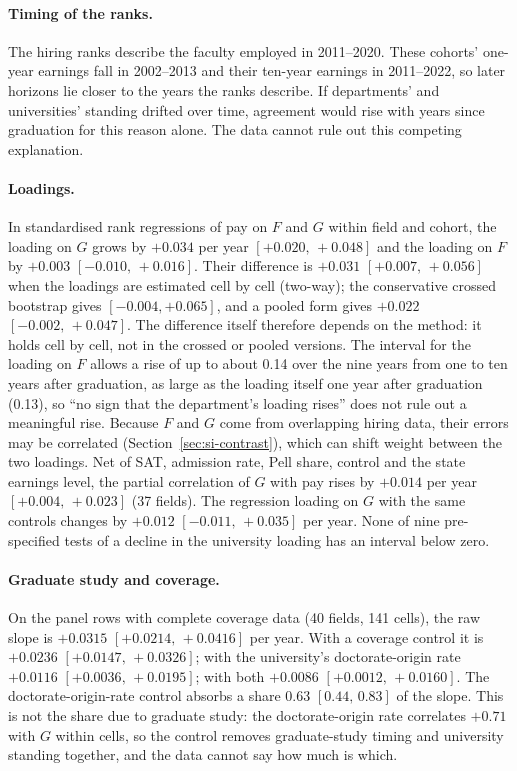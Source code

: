 \documentclass[11pt]{article}
\newcommand{\ci}[2]{$[#1,\allowbreak\,#2]$}
\begin{document}
\paragraph{Timing of the ranks.} The hiring ranks describe the faculty employed in 2011--2020. These cohorts'
one-year earnings fall in 2002--2013 and their ten-year earnings in 2011--2022, so later horizons lie closer to the
years the ranks describe. If departments' and universities' standing drifted over time, agreement would rise with
years since graduation for this reason alone. The data cannot rule out this competing explanation.

\paragraph{Loadings.} In standardised rank regressions of pay on $F$ and $G$ within field and cohort, the loading on
$G$ grows by $+0.034$ per year \ci{+0.020}{+0.048} and the loading on $F$ by $+0.003$ \ci{-0.010}{+0.016}. Their
difference is $+0.031$ \ci{+0.007}{+0.056} when the loadings are estimated cell by cell (two-way); the conservative
crossed bootstrap gives $[-0.004, +0.065]$, and a pooled form gives $+0.022$ \ci{-0.002}{+0.047}. The
difference itself therefore depends on the method: it holds cell by cell, not in the crossed or pooled versions. The
interval for the loading on $F$ allows a rise of up to about 0.14 over the nine years from one to ten years after
graduation, as large as the loading itself one year after graduation (0.13), so ``no sign that the department's
loading rises'' does not rule out a meaningful rise. Because $F$ and $G$ come from overlapping hiring data, their
errors may be correlated (Section~\ref{sec:si-contrast}), which can shift weight between the two loadings. Net of SAT,
admission rate, Pell share, control and the state earnings level, the partial correlation of $G$ with pay rises by
$+0.014$ per year \ci{+0.004}{+0.023} (37 fields). The regression loading on $G$ with the same
controls changes by $+0.012$ \ci{-0.011}{+0.035} per year. None of nine pre-specified tests of a decline in the
university loading has an interval below zero.

\paragraph{Graduate study and coverage.} On the panel rows with complete coverage data (40 fields, 141
cells), the raw slope is $+0.0315$ \ci{+0.0214}{+0.0416} per year. With a coverage control it is $+0.0236$
\ci{+0.0147}{+0.0326}; with the university's doctorate-origin rate $+0.0116$ \ci{+0.0036}{+0.0195}; with both
$+0.0086$ \ci{+0.0012}{+0.0160}. The doctorate-origin-rate control absorbs a share 0.63 \ci{0.44}{0.83} of the slope.
This is not the share due to graduate study: the doctorate-origin rate correlates $+0.71$ with $G$ within cells, so
the control removes graduate-study timing and university standing together, and the data cannot say how much is
which.
\end{document}
